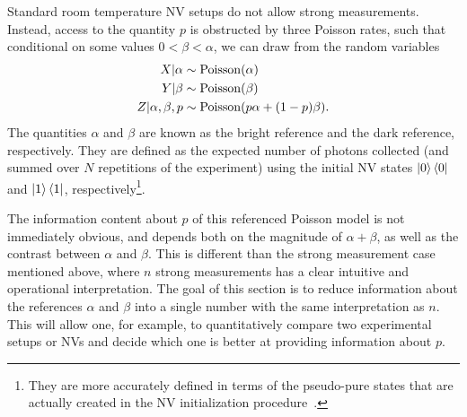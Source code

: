 \documentclass[aps,nofootinbib,twocolumn,superscriptaddress]{revtex4}
\begin{document}
Standard room temperature NV setups do not allow strong measurements. 
Instead, access to the quantity $p$ is obstructed by three Poisson rates,
such that conditional on some values $0<\beta<\alpha$, we can 
draw from the random variables
\begin{align}
    X|\alpha &\sim \operatorname{Poisson}(\alpha) \nonumber \\
    Y|\beta &\sim \operatorname{Poisson}(\beta) \nonumber \\
    Z|\alpha,\beta,p &\sim \operatorname{Poisson}(p\alpha + (1-p)\beta).
\end{align}
The quantities $\alpha$ and $\beta$ are known as the bright reference
and the dark reference, respectively.
They are defined as the 
expected number of photons collected (and summed over $N$
repetitions of the experiment) using the initial NV states
$\ket{0}\bra{0}$ and $\ket{1}\bra{1}$, respectively\footnote{They are
more accurately defined in terms of the pseudo-pure states 
that are actually created in the NV initialization procedure~\cite{hincks_statistical_2017}.}.

The information content about $p$ of this referenced Poisson model is not
immediately obvious, 
and depends both on the magnitude of $\alpha+\beta$, 
as well as the contrast between $\alpha$ and $\beta$.
This is different than the strong measurement case mentioned above,
where $n$ strong measurements has a clear intuitive and operational 
interpretation.
The goal of this section is to reduce information about the references
$\alpha$ and $\beta$ into a single number 
with the same interpretation as $n$.
This will allow one, for example,
to quantitatively compare two experimental setups or NVs and
decide which one is better at providing information about $p$. 
\end{document}
